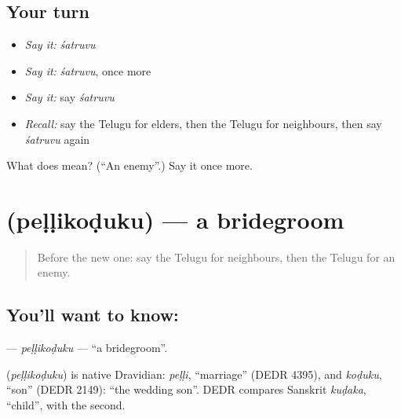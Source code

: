 \subsection*{Your turn}
\begin{itemize}
\raggedright
  \item \emph{Say it:} \emph{śatruvu}
  \item \emph{Say it:} \emph{śatruvu}, once more
  \item \emph{Say it:} say \emph{śatruvu}
  \item \emph{Recall:} say the Telugu for elders, then the Telugu for neighbours, then say \emph{śatruvu} again
\end{itemize}

\begin{tcolorbox}[breakable,colback=teal!4,colframe=teal!35!black,title={Before you move on}]
What does  mean? (\textquotedblleft{}An enemy\textquotedblright{}.) Say it once more.
\end{tcolorbox}
\section[\texorpdfstring{\te{పెళ్ళికొడుకు} (peḷḷikoḍuku)}{పెళ్ళికొడుకు (peḷḷikoḍuku)}]{ (peḷḷikoḍuku) — a bridegroom}

\label{lesson:TE-C227-pellikoduku}



\begin{quote}
Before the new one: say the Telugu for neighbours, then the Telugu for an enemy.
\end{quote}

\subsection*{You'll want to know: }
\textbf{} — \emph{peḷḷikoḍuku} — \textquotedblleft{}a bridegroom\textquotedblright{}.

\begin{cousinweb}
\textbf{} (\emph{peḷḷikoḍuku}) is native Dravidian: \emph{peḷḷi}, \textquotedblleft{}marriage\textquotedblright{} (DEDR 4395), and \emph{koḍuku}, \textquotedblleft{}son\textquotedblright{} (DEDR 2149): \textquotedblleft{}the wedding son\textquotedblright{}. DEDR compares Sanskrit \emph{kuḍaka}, \textquotedblleft{}child\textquotedblright{}, with the second.
\end{cousinweb}

